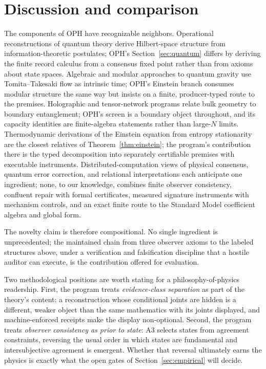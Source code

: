 \documentclass[11pt]{article}
\theoremstyle{remark}
\begin{document}
\section{Discussion and comparison}
\label{sec:discussion}

The components of OPH have recognizable neighbors. Operational
reconstructions of quantum theory derive Hilbert-space structure from
information-theoretic postulates; OPH's Section~\ref{sec:quantum} differs by
deriving the finite record calculus from a consensus fixed point rather
than from axioms about state spaces. Algebraic and modular approaches to
quantum gravity use Tomita--Takesaki flow as intrinsic time; OPH's Einstein
branch consumes modular structure the same way but insists on a finite,
producer-typed route to the premises. Holographic and tensor-network
programs relate bulk geometry to boundary entanglement; OPH's screen is a
boundary object throughout, and its capacity identities are finite-algebra
statements rather than large-$N$ limits. Thermodynamic derivations of the
Einstein equation from entropy stationarity are the closest relatives of
Theorem~\ref{thm:einstein}; the program's contribution there is the typed
decomposition into separately certifiable premises with executable
instruments. Distributed-computation views of physical consensus,
quantum error correction, and relational interpretations each anticipate one
ingredient; none, to our knowledge, combines finite observer consistency,
confluent repair with formal certificates, measured signature instruments
with mechanism controls, and an exact finite route to the Standard Model
coefficient algebra and global form.

The novelty claim is therefore compositional. No single ingredient is
unprecedented; the maintained chain from three observer axioms to the
labeled structures above, under a verification and falsification discipline
that a hostile auditor can execute, is the contribution offered for
evaluation.

Two methodological positions are worth stating for a philosophy-of-physics
readership. First, the program treats \emph{evidence-class separation} as
part of the theory's content: a reconstruction whose conditional joints are
hidden is a different, weaker object than the same mathematics with its
joints displayed, and machine-enforced receipts make the display
non-optional. Second, the program treats \emph{observer consistency as
prior to state}: A3 selects states from agreement constraints, reversing
the usual order in which states are fundamental and intersubjective
agreement is emergent. Whether that reversal ultimately earns the physics
is exactly what the open gates of Section~\ref{sec:empirical} will decide.
\end{document}
